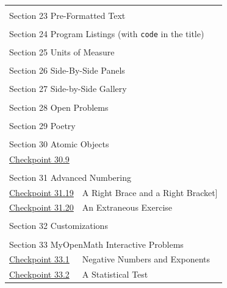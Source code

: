 \documentclass{amsart}
\theoremstyle{plain}%
\theoremstyle{definition}%
\theoremstyle{remark}%
\newcommand{\mono}[1]{\texttt{#1}}
\numberwithin{equation}{section}
\begin{document}
\begin{longtable}[l]{ll}
\multicolumn{2}{l}{\null}\\[1.5ex] \multicolumn{2}{l}{\large Section 23 Pre-Formatted Text}\\[0.5ex]
\multicolumn{2}{l}{\null}\\[1.5ex] \multicolumn{2}{l}{\large Section 24 Program Listings (with \mono{code} in the title)}\\[0.5ex]
\multicolumn{2}{l}{\null}\\[1.5ex] \multicolumn{2}{l}{\large Section 25 Units of Measure}\\[0.5ex]
\multicolumn{2}{l}{\null}\\[1.5ex] \multicolumn{2}{l}{\large Section 26 Side-By-Side Panels}\\[0.5ex]
\multicolumn{2}{l}{\null}\\[1.5ex] \multicolumn{2}{l}{\large Section 27 Side-by-Side Gallery}\\[0.5ex]
\multicolumn{2}{l}{\null}\\[1.5ex] \multicolumn{2}{l}{\large Section 28 Open Problems}\\[0.5ex]
\multicolumn{2}{l}{\null}\\[1.5ex] \multicolumn{2}{l}{\large Section 29 Poetry}\\[0.5ex]
\multicolumn{2}{l}{\null}\\[1.5ex] \multicolumn{2}{l}{\large Section 30 Atomic Objects}\\[0.5ex]
\hyperref[atomic-image-25]{Checkpoint 30.9}& \\
\multicolumn{2}{l}{\null}\\[1.5ex] \multicolumn{2}{l}{\large Section 31 Advanced Numbering}\\[0.5ex]
\hyperref[exercise-difficult-title]{Checkpoint 31.19}& A Right Brace \textbraceright{} and a Right Bracket]\\
\hyperref[section-advanced-numbering-12-2]{Checkpoint 31.20}& An Extraneous Exercise\\
\multicolumn{2}{l}{\null}\\[1.5ex] \multicolumn{2}{l}{\large Section 32 Customizations}\\[0.5ex]
\multicolumn{2}{l}{\null}\\[1.5ex] \multicolumn{2}{l}{\large Section 33 MyOpenMath Interactive Problems}\\[0.5ex]
\hyperref[section-myopenmath-3]{Checkpoint 33.1}& Negative Numbers and Exponents\\
\hyperref[section-myopenmath-4]{Checkpoint 33.2}& A Statistical Test\\

\end{longtable}
\end{document}
